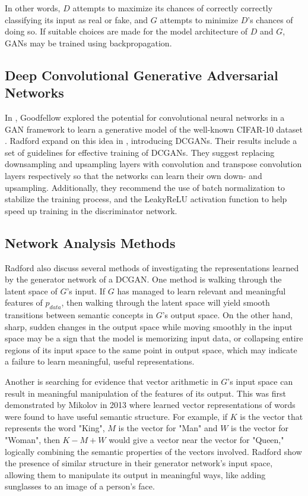 \documentclass[10pt,twocolumn,letterpaper]{article}
\begin{document}
In other words, $ D $ attempts to maximize its chances of correctly correctly classifying its input
as real or fake, and $ G $ attempts to minimize $ D $'s chances of doing so. If suitable choices
are made for the model architecture of $ D $ and $ G $, GANs may be trained using backpropagation.

\subsection{Deep Convolutional Generative Adversarial Networks}
In \cite{goodfellow2014generative}, Goodfellow \etal explored the potential for convolutional neural
networks in a GAN framework to learn a generative model of the well-known CIFAR-10 dataset
\cite{krizhevsky2014cifar}. Radford \etal expand on this idea in \cite{radford2015unsupervised},
introducing DCGANs. Their results include a set of guidelines for effective training of
DCGANs. They suggest replacing downsampling and upsampling layers with convolution and transpose
convolution layers respectively so that the networks can learn their own down- and upsampling. Additionally, they recommend the use of batch normalization to stabilize the training process, and the LeakyReLU
activation function \cite{maas2013rectifier} to help speed up training in the discriminator network.

\subsection{Network Analysis Methods}
Radford \etal also discuss several methods of investigating the representations learned by the generator
network of a DCGAN. One method is walking through the latent space of $ G $'s input. If $ G $ has managed
to learn relevant and meaningful features of $ p_{data} $, then walking through the latent space will
yield smooth transitions between semantic concepts in $ G $'s output space. On the other hand, sharp, sudden changes in the output space while moving smoothly in the input space may be a sign that the model is memorizing input data, or collapsing entire regions of its input space to the same point in output space, which may indicate a failure to learn meaningful, useful representations.

Another is searching for evidence that vector arithmetic in $ G $'s input space can result in meaningful
manipulation of the features of its output. This was first demonstrated by Mikolov \etal in 2013 \cite{mikolov2013distributed} where learned vector representations of words were found to have useful semantic structure. For example, if $ K $ is the vector that represents the word "King", $ M $ is the vector for "Man" and $ W $ is the vector for "Woman", then $ K - M + W $ would give a vector near the vector for "Queen," logically combining the semantic properties of the vectors involved. Radford \etal \cite{radford2015unsupervised} show the presence of similar structure in their generator network's input space, allowing them to manipulate its output in meaningful ways, like adding sunglasses to an image of a person's face.
\end{document}

